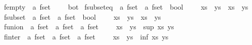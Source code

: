\begin{isabellebody}
\isanewline
\isanewline
{}\isamarkupfalse%
\ fempty\ {\isacharcolon}{\isacharcolon}\ {\isachardoublequoteopen}{\isacharprime}a\ fset{\isachardoublequoteclose}\ {\isacharparenleft}{\isachardoublequoteopen}{\isacharbraceleft}{\isacharbar}{\isacharbar}{\isacharbraceright}{\isachardoublequoteclose}{\isacharparenright}\ \ {\isachardoublequoteopen}{\isacharbraceleft}{\isacharbar}{\isacharbar}{\isacharbraceright}\ {\isasymequiv}\ bot{\isachardoublequoteclose}\isanewline
{}\isamarkupfalse%
\ fsubset{\isacharunderscore}eq\ {\isacharcolon}{\isacharcolon}\ {\isachardoublequoteopen}{\isacharprime}a\ fset\ {\isasymRightarrow}\ {\isacharprime}a\ fset\ {\isasymRightarrow}\ bool{\isachardoublequoteclose}\ {\isacharparenleft}\ {\isachardoublequoteopen}{\isacharbar}{\isasymsubseteq}{\isacharbar}{\isachardoublequoteclose}\ {}{}{\isacharparenright}\ \ {\isachardoublequoteopen}xs\ {\isacharbar}{\isasymsubseteq}{\isacharbar}\ ys\ {\isasymequiv}\ xs\ {\isasymle}\ ys{\isachardoublequoteclose}\isanewline
{}\isamarkupfalse%
\ fsubset\ {\isacharcolon}{\isacharcolon}\ {\isachardoublequoteopen}{\isacharprime}a\ fset\ {\isasymRightarrow}\ {\isacharprime}a\ fset\ {\isasymRightarrow}\ bool{\isachardoublequoteclose}\ {\isacharparenleft}\ {\isachardoublequoteopen}{\isacharbar}{\isasymsubset}{\isacharbar}{\isachardoublequoteclose}\ {}{}{\isacharparenright}\ \ {\isachardoublequoteopen}xs\ {\isacharbar}{\isasymsubset}{\isacharbar}\ ys\ {\isasymequiv}\ xs\ {\isacharless}\ ys{\isachardoublequoteclose}\isanewline
{}\isamarkupfalse%
\ funion\ {\isacharcolon}{\isacharcolon}\ {\isachardoublequoteopen}{\isacharprime}a\ fset\ {\isasymRightarrow}\ {\isacharprime}a\ fset\ {\isasymRightarrow}\ {\isacharprime}a\ fset{\isachardoublequoteclose}\ {\isacharparenleft}\ {\isachardoublequoteopen}{\isacharbar}{\isasymunion}{\isacharbar}{\isachardoublequoteclose}\ {}{}{\isacharparenright}\ \ {\isachardoublequoteopen}xs\ {\isacharbar}{\isasymunion}{\isacharbar}\ ys\ {\isasymequiv}\ sup\ xs\ ys{\isachardoublequoteclose}\isanewline
{}\isamarkupfalse%
\ finter\ {\isacharcolon}{\isacharcolon}\ {\isachardoublequoteopen}{\isacharprime}a\ fset\ {\isasymRightarrow}\ {\isacharprime}a\ fset\ {\isasymRightarrow}\ {\isacharprime}a\ fset{\isachardoublequoteclose}\ {\isacharparenleft}\ {\isachardoublequoteopen}{\isacharbar}{\isasyminter}{\isacharbar}{\isachardoublequoteclose}\ {}{}{\isacharparenright}\ \ {\isachardoublequoteopen}xs\ {\isacharbar}{\isasyminter}{\isacharbar}\ ys\ {\isasymequiv}\ inf\ xs\ ys{\isachardoublequoteclose}\isanewline

\end{isabellebody}
